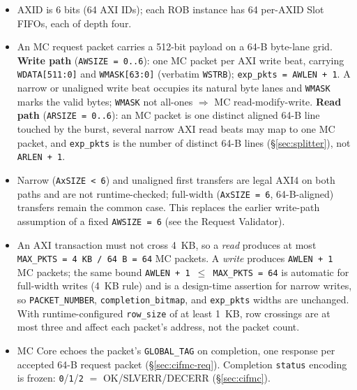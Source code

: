 \begin{itemize}[noitemsep]
  \item AXID is 6 bits (64 AXI IDs); each ROB instance has 64 per-AXID Slot
        FIFOs, each of depth four.
  \item An MC request packet carries a 512-bit payload on a 64-B byte-lane
        grid.  \textbf{Write path} (\texttt{AWSIZE = 0..6}): one MC packet per
        AXI write beat, carrying \texttt{WDATA[511:0]} and \texttt{WMASK[63:0]}
        (verbatim \texttt{WSTRB}); \texttt{exp\_pkts = AWLEN + 1}.  A narrow or
        unaligned write beat occupies its natural byte lanes and \texttt{WMASK}
        marks the valid bytes; \texttt{WMASK} not all-ones $\Rightarrow$ MC
        read-modify-write.  \textbf{Read path} (\texttt{ARSIZE = 0..6}): an MC
        packet is one distinct aligned 64-B line touched by the burst, several
        narrow AXI read beats may map to one MC packet, and \texttt{exp\_pkts}
        is the number of distinct 64-B lines (\S\ref{sec:splitter}), not
        \texttt{ARLEN + 1}.
  \item Narrow (\texttt{AxSIZE < 6}) and unaligned first transfers are legal
        AXI4 on both paths and are not runtime-checked; full-width
        (\texttt{AxSIZE = 6}, 64-B-aligned) transfers remain the common case.
        This replaces the earlier write-path assumption of a fixed
        \texttt{AWSIZE = 6} (see the Request Validator).
  \item An AXI transaction must not cross 4~KB, so a \emph{read} produces at
        most \texttt{MAX\_PKTS = 4\,KB / 64\,B = 64} MC packets.  A
        \emph{write} produces \texttt{AWLEN + 1} MC packets; the same bound
        \texttt{AWLEN + 1 $\le$ MAX\_PKTS = 64} is automatic for full-width
        writes (4~KB rule) and is a design-time assertion for narrow writes,
        so \texttt{PACKET\_NUMBER}, \texttt{completion\_bitmap}, and
        \texttt{exp\_pkts} widths are unchanged.  With runtime-configured
        \texttt{row\_size} of at least 1~KB, row crossings are at most three
        and affect each packet's address, not the packet count.
  \item MC Core echoes the packet's \texttt{GLOBAL\_TAG} on completion, one
        response per accepted 64-B request packet (\S\ref{sec:cifmc-req}).
        Completion \texttt{status} encoding is frozen: \texttt{0}/\texttt{1}/\texttt{2}
        $=$ OK/SLVERR/DECERR (\S\ref{sec:cifmc}).
\end{itemize}

